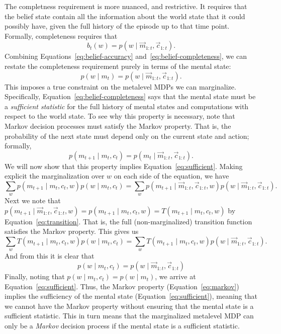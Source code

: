 The completness requirement is more nuanced, and restrictive. It requires that the belief state contain all the information about the world state that it could possibly have, given the full history of the episode up to that time point. Formally, completeness requires that
\begin{equation}\label{eq:belief-completeness}
  b_t(w) = p(w \mid \vec{m}_{1:t}, \vec{c}_{1:t}).
\end{equation}
Combining Equations~\ref{eq:belief-accuracy} and~\ref{eq:belief-completeness}, we can restate the completeness requirement purely in terms of the mental state:
\begin{equation}\label{eq:sufficient}
  p(w \mid m_t) = p(w \mid \vec{m}_{1:t}, \vec{c}_{1:t}).
\end{equation}
This imposes a true constraint on the metalevel MDPs we can marginalize. Specifically, Equation~\ref{eq:belief-completeness} says that the mental state must be a \emph{sufficient statistic} for the full history of mental states and computations with respect to the world state. To see why this property is necessary, note that Markov decision processes must satisfy the Markov property. That is, the probability of the next state must depend only on the current state and action; formally,
\begin{equation}\label{eq:markov}
  p(m_{t+1} \mid m_t, c_t) = p(m_t \mid \vec{m}_{1:t}, \vec{c}_{1:t}).
\end{equation}
We will now show that this property implies Equation~\ref{eq:sufficient}.
Making explicit the marginalization over $w$ on each side of the equation, we have
\begin{equation}
  \sum_w p(m_{t+1} \mid m_t, c_t, w) p(w \mid m_t, c_t) =
  \sum_w p(m_{t+1} \mid \vec{m}_{1:t}, \vec{c}_{1:t}, w) p(w \mid \vec{m}_{1:t}, \vec{c}_{1:t}).
\end{equation}
Next we note that $p(m_{t+1} \mid \vec{m}_{1:t}, \vec{c}_{1:t}, w) = p(m_{t+1} \mid m_t, c_t, w) = T(m_{t+1} \mid m_t, c_t, w)$ by Equation~\ref{eq:transition}. That is, the full (non-marginalized) transition function satisfies the Markov property. This gives us
\begin{equation}
  \sum_w T(m_{t+1} \mid m_t, c_t, w) p(w \mid m_t, c_t) =
  \sum_w T(m_{t+1} \mid m_t, c_t, w) p(w \mid \vec{m}_{1:t}, \vec{c}_{1:t}).
\end{equation}
And from this it is clear that 
%
\begin{equation}
  p(w \mid m_t, c_t) = p(w \mid \vec{m}_{1:t}, \vec{c}_{1:t})
\end{equation}
%
Finally, noting that $p(w \mid m_t, c_t) = p(w \mid m_t)$, we arrive at Equation~\ref{eq:sufficient}. Thus, the Markov property (Equation~\ref{eq:markov}) implies the sufficiency of the mental state (Equation~\ref{eq:sufficient}), meaning that we cannot have the Markov property without ensuring that the mental state is a sufficient statistic. This in turn means that the marginalized metalevel MDP can only be a \emph{Markov} decision process if the mental state is a sufficient statistic.


